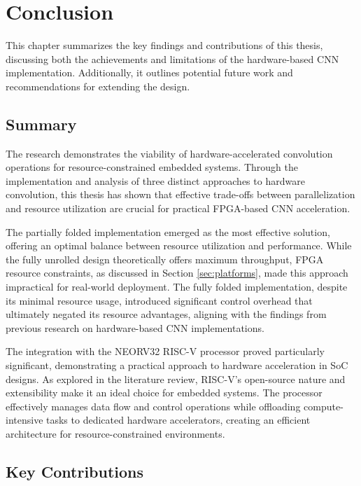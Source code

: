 \chapter[Conclusion]{Conclusion}
\label{Chap:Conclusion}

This chapter summarizes the key findings and contributions of this thesis, discussing both the achievements and limitations of the hardware-based CNN implementation. Additionally, it outlines potential future work and recommendations for extending the design.

\section{Summary}

The research demonstrates the viability of hardware-accelerated convolution operations for resource-constrained embedded systems. Through the implementation and analysis of three distinct approaches to hardware convolution, this thesis has shown that effective trade-offs between parallelization and resource utilization are crucial for practical FPGA-based CNN acceleration.

The partially folded implementation emerged as the most effective solution, offering an optimal balance between resource utilization and performance. While the fully unrolled design theoretically offers maximum throughput, FPGA resource constraints, as discussed in Section \ref{sec:platforms}, made this approach impractical for real-world deployment. The fully folded implementation, despite its minimal resource usage, introduced significant control overhead that ultimately negated its resource advantages, aligning with the findings from previous research on hardware-based CNN implementations.

The integration with the NEORV32 RISC-V processor proved particularly significant, demonstrating a practical approach to hardware acceleration in SoC designs. As explored in the literature review, RISC-V's open-source nature and extensibility make it an ideal choice for embedded systems. The processor effectively manages data flow and control operations while offloading compute-intensive tasks to dedicated hardware accelerators, creating an efficient architecture for resource-constrained environments.

\section{Key Contributions}

